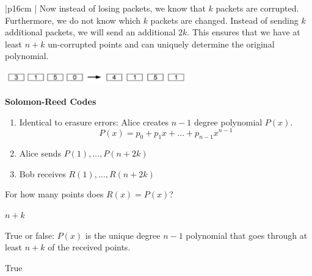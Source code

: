 {\tabulinesep=1mm
\begin{tabu}{|p{16cm} |}
\hline
Now instead of losing packets, we know that $k$ packets are corrupted. 
Furthermore, we do not know which $k$ packets are changed. Instead of 
sending $k$ additional packets, we will send an additional $2k$. This ensures that we
have at least $n+k$ un-corrupted points and can uniquely determine the original polynomial. \newline
\begin{center}
\includegraphics[width=8cm, height=0.6cm]{general_intro.jpg}
\end{center}

\textbf{Solomon-Reed Codes}
\begin{enumerate}
\item Identical to erasure errors: Alice creates $n - 1$ degree polynomial 
$P(x)$.\newline
\[P(x) = p_0 + p_1x + \dotsc + p_{n-1}x^{n-1} \]
\item Alice sends $P(1), \dotsc, P(n + 2k)$ \\
\item Bob receives $R(1), \dotsc, R(n + 2k) $ \newline
\end{enumerate}

For how many points does $R(x) = P(x)$? \newline
\begin{solution}
$ n + k$
\end{solution}

True or false: $P(x)$ is the unique degree $n - 1$ polynomial that goes 
through at least $n + k$ of the received points.\newline
\begin{solution}
True
\end{solution}

\\
\hline
\end{tabu}
}

